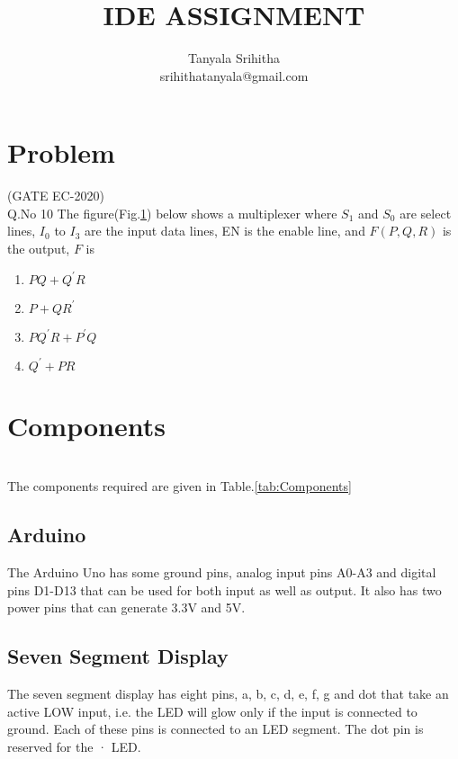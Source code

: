 \documentclass[journal,twocolumn,10pt, a4paper]{article}
\begin{document}
\lstset{ 
  language=C++,
  basicstyle=\ttfamily\footnotesize,
  breaklines=true,
  frame=lines}


\title{IDE ASSIGNMENT}
\author{Tanyala Srihitha\\srihithatanyala@gmail.com}
\maketitle
\tableofcontents 

\section{Problem}                               
(GATE EC-2020)\\                                  
Q.No 10    The figure(Fig.\ref{fig:Fig 1}) below shows a multiplexer where $S_1$ and $S_0$ are select lines, $I_0$ to $I_3$ are the input data lines, EN is the enable line, and $F(P,Q,R)$ is the output, $F$ is
\begin{figure}[H]

\caption{}
\label{fig:Fig 1}
\end{figure}

\begin{enumerate}
   \item $PQ +{Q^\prime} R$
   \item $P+Q {R^\prime}$
   \item $P{Q^\prime} R+{P^\prime}Q$
   \item ${Q^\prime} +PR$
\end{enumerate}

\section{Components}\\
The components required are given in Table.\ref{tab:Components}
\begin{table}[H]
\centering

\caption{}
\label{tab:Components}
\end{table}

\subsection{Arduino}
The Arduino Uno has some ground pins, analog input pins A0-A3 and digital pins D1-D13 that can be used for both input as well as output. It also has two power pins that can generate 3.3V and 5V.
\subsection{Seven Segment Display}
The seven segment display has eight pins, a, b, c, d, e, f, g and dot that take an active LOW input, i.e. the LED will glow only if the input is connected to ground. Each of these pins is connected to an LED segment. The dot pin is reserved for the · LED.
\end{document}
